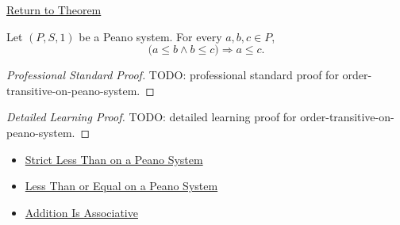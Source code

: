 \newpage
{}
\label{prf:order-transitive-on-peano-system}

\begin{remark*}[Return]
\hyperref[thm:order-transitive-on-peano-system]{Return to Theorem}
\end{remark*}

\begin{theorem*}
Let $(P,S,1)$ be a Peano system. For every $a,b,c \in P$,
\[
\bigl(a \le b \land b \le c\bigr)
\Longrightarrow
a \le c.
\]
\end{theorem*}

\begin{proof}[Professional Standard Proof]
\LRAProofBodyStart
TODO: professional standard proof for order-transitive-on-peano-system.
\end{proof}

\begin{proof}[Detailed Learning Proof]
\LRAProofBodyStart
TODO: detailed learning proof for order-transitive-on-peano-system.
\end{proof}

\begin{remark*}
\end{remark*}

\begin{dependencies}
\begin{itemize}
  \item \hyperref[def:strict-less-than-on-peano-system]{Strict Less Than on a Peano System}
  \item \hyperref[def:less-than-or-equal-on-peano-system]{Less Than or Equal on a Peano System}
  \item \hyperref[thm:addition-associative]{Addition Is Associative}
\end{itemize}
\end{dependencies}

\clearpage
